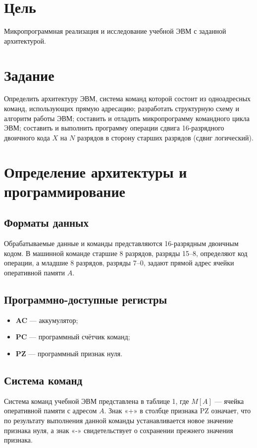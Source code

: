 \documentclass[11pt, a4paper]{article}
\begin{document}
\tableofcontents
\newpage

\section{Цель}
Микропрограммная реализация и исследование учебной ЭВМ с заданной архитектурой.

\section{Задание}
Определить архитектуру ЭВМ, система команд которой состоит из одноадресных команд, использующих прямую адресацию; разработать структурную схему и алгоритм работы ЭВМ; составить и отладить микропрограмму командного цикла ЭВМ; составить и выполнить программу операции сдвига 16-разрядного двоичного кода $X$ на $N$ разрядов в сторону старших разрядов (сдвиг логический).

\section{Определение архитектуры и программирование}

\subsection{Форматы данных}
Обрабатываемые данные и команды представляются 16-разрядным двоичным кодом. В машинной команде старшие 8 разрядов, разряды 15--8, определяют код операции, а младшие 8 разрядов, разряды 7--0, задают прямой адрес ячейки оперативной памяти $A$.

\subsection{Программно-доступные регистры}
\begin{itemize}
	\item \textbf{AC} --- аккумулятор;
	\item \textbf{PC} --- программный счётчик команд;
	\item \textbf{PZ} --- программный признак нуля.
\end{itemize}

\subsection{Система команд}
Система команд учебной ЭВМ представлена в таблице 1, где $M[A]$ --- ячейка оперативной памяти с адресом $A$. Знак «+» в столбце признака PZ означает, что по результату выполнения данной команды устанавливается новое значение признака нуля, а знак «-» свидетельствует о сохранении прежнего значения признака.
\end{document}
